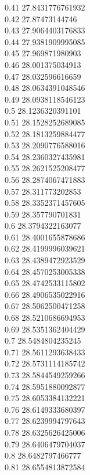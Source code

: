 {0.41	27.8431776761932\\
0.42	27.87473144746\\
0.43	27.9064403176833\\
0.44	27.9381909995085\\
0.45	27.969871980903\\
0.46	28.001375034913\\
0.47	28.032596616659\\
0.48	28.0634391048546\\
0.49	28.0938118546123\\
0.5	28.1236320391101\\
0.51	28.1528252689085\\
0.52	28.1813259884477\\
0.53	28.2090776588016\\
0.54	28.2360327435981\\
0.55	28.2621525208477\\
0.56	28.2874067471883\\
0.57	28.311773202853\\
0.58	28.3352371457605\\
0.59	28.357790701831\\
0.6	28.3794322163077\\
0.61	28.4001655878686\\
0.62	28.4199996039621\\
0.63	28.4389472923529\\
0.64	28.4570253005338\\
0.65	28.4742533115802\\
0.66	28.4906535022916\\
0.67	28.5062500471258\\
0.68	28.5210686694953\\
0.69	28.5351362404429\\
0.7	28.5484804235245\\
0.71	28.5611293638433\\
0.72	28.5731114185742\\
0.73	28.5844549259266\\
0.74	28.5951880092877\\
0.75	28.6053384132221\\
0.76	28.6149333680397\\
0.77	28.6239994797643\\
0.78	28.6325626425006\\
0.79	28.6406479704037\\
0.8	28.6482797466777\\
0.81	28.6554813872584\\
}
